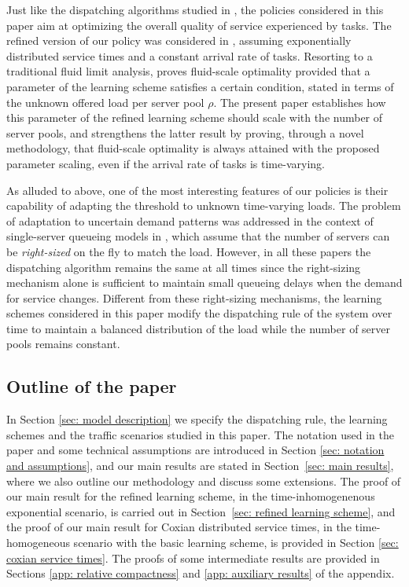 \documentclass[a4paper, 12pt]{article}
\theoremstyle{definition}
\begin{document}
Just like the dispatching algorithms studied in \cite{mukherjee2020asymptotic}, the policies considered in this paper aim at optimizing the overall quality of service experienced by tasks. The refined version of our policy was considered in \cite{goldsztajn2021self}, assuming exponentially distributed service times and a constant arrival rate of tasks. Resorting to a traditional fluid limit analysis, \cite{goldsztajn2021self} proves fluid-scale optimality provided that a parameter of the learning scheme satisfies a certain condition, stated in terms of the unknown offered load per server pool $\rho$. The present paper establishes how this parameter of the refined learning scheme should scale with the number of server pools, and strengthens the latter result by proving, through a novel methodology, that fluid-scale optimality is always attained with the proposed parameter scaling, even if the arrival rate of tasks is time-varying.

As alluded to above, one of the most interesting features of our policies is their capability of adapting the threshold to unknown time-varying loads. The problem of adaptation to uncertain demand patterns was addressed in the context of single-server queueing models in \cite{goldsztajn2021automatic,goldsztajn2018controlling,mukherjee2017optimal,mukherjee2019join}, which assume that the number of servers can be \emph{right-sized} on the fly to match the load. However, in all these papers the dispatching algorithm remains the same at all times since the right-sizing mechanism alone is sufficient to maintain small queueing delays when the demand for service changes. Different from these right-sizing mechanisms, the learning schemes considered in this paper modify the dispatching rule of the system over time to maintain a balanced distribution of the load while the number of server pools remains constant. 

\subsection{Outline of the paper}

In Section \ref{sec: model description} we specify the dispatching rule, the learning schemes and the traffic scenarios studied in this paper. The notation used in the paper and some technical assumptions are introduced in Section \ref{sec: notation and assumptions}, and our main results are stated in Section~\ref{sec: main results}, where we also outline our methodology and discuss some extensions. The proof of our main result for the refined learning scheme, in the time-inhomogenenous exponential scenario, is carried out in Section~\ref{sec: refined learning scheme}, and the proof of our main result for Coxian distributed service times, in the time-homogeneous scenario with the basic learning scheme, is provided in Section \ref{sec: coxian service times}. The proofs of some intermediate results are provided in Sections \ref{app: relative compactness} and \ref{app: auxiliary results} of the appendix.
\end{document}
